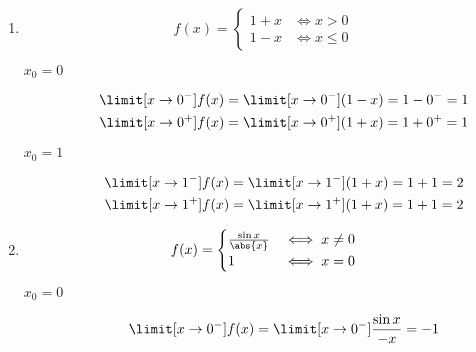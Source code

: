 \begin{enumerate}[label={\alph*)}]
    \item
        \begin{equation*}
            f(x) = \begin{cases}
                1 + x & \iff x > 0\\
                1 - x & \iff x \leq 0
            \end{cases}
        \end{equation*}
        \begin{description}
            \item[\(x_0 = 0\)]
                \begin{gather*}
                    \limit[x \to 0^-] f(x)
                        = \limit[x \to 0^-] (1 - x)
                        = 1 - 0^-
                        = 1\\
                    \limit[x \to 0^+] f(x)
                        = \limit[x \to 0^+] (1 + x)
                        = 1 + 0^+
                        = 1
                \end{gather*}
            \item[\(x_0 = 1\)]
                \begin{gather*}
                    \limit[x \to 1^{-}] f(x)
                        = \limit[x \to 1^-] (1 + x)
                        = 1 + 1
                        = 2\\
                    \limit[x \to 1^+] f(x)
                        = \limit[x \to 1^+] (1 + x)
                        = 1 + 1
                        = 2
                \end{gather*}
        \end{description}
    \item
        \begin{equation*}
            f(x) = \begin{cases}
                \frac{\sin{x}}{\abs{x}} & \iff x \neq 0\\
                1 & \iff x = 0
            \end{cases}
        \end{equation*}
        \begin{description}
            \item[\(x_0 = 0\)]
                \begin{gather*}
                    \limit[x \to 0^-] f(x)
                        = \limit[x \to 0^{-}] \frac{\sin x}{-x}
                        = -1\\

\end{gather*}
\end{description}
\end{enumerate}

